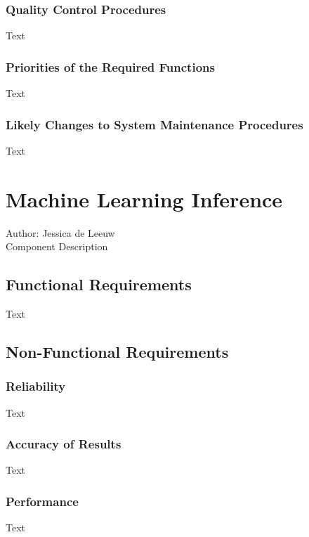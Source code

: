 \documentclass[12pt]{article}
\begin{document}
\subsubsection {Quality Control Procedures}

Text

\subsubsection {Priorities of the Required Functions}

Text

\subsubsection {Likely Changes to System Maintenance Procedures}

Text

\section{Machine Learning Inference}
Author: Jessica de Leeuw\\

\noindent Component Description

\subsection{Functional Requirements}

Text

\subsection{Non-Functional Requirements}

\subsubsection {Reliability}

Text

\subsubsection {Accuracy of Results}
 
Text

\subsubsection {Performance}

Text
\end{document}

